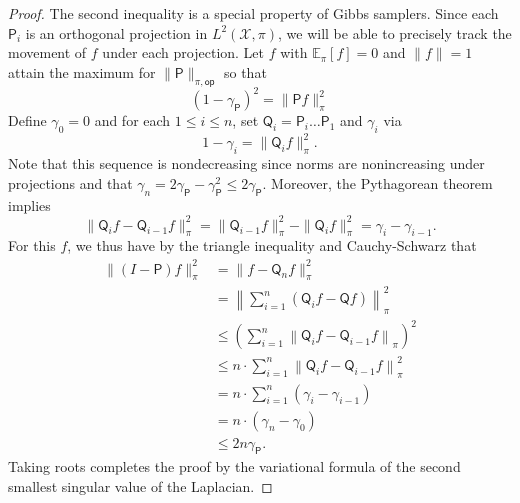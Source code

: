 \documentclass[10pt,a4paper]{article}
\begin{document}
\begin{proof}
    The second inequality is a special property of Gibbs samplers. Since each $\mathsf{P}_i$ is an orthogonal projection in $L^2(\mathcal{X},\pi)$, we will be able to precisely track the movement of $f$ under each projection. Let $f$ with $\mathbb{E}_{\pi}[f]=0$ and $\|f\|=1$ attain the maximum for $\|\mathsf{P}\|_{\pi,\mathsf{op}}$ so that
    \begin{equation*}
        (1-\gamma_{\mathsf{P}})^2=\|\mathsf{P}f\|_{\pi}^2
    \end{equation*} 
    Define $\gamma_0 = 0$ and for each $1\leq i\leq n$, set $\mathsf{Q}_i=\mathsf{P}_i\ldots \mathsf{P}_1$ and $\gamma_i$ via
    \begin{equation*}
        1-\gamma_i = \|\mathsf{Q}_if\|_{\pi}^2.
    \end{equation*}
    Note that this sequence is nondecreasing since norms are nonincreasing under projections and that $\gamma_n=2\gamma_{\mathsf{P}}-\gamma_{\mathsf{P}}^2\leq 2\gamma_{\mathsf{P}}$. Moreover, the Pythagorean theorem implies
    \begin{equation*}
        \|\mathsf{Q}_if-\mathsf{Q}_{i-1}f\|_{\pi}^2 = \|\mathsf{Q}_{i-1}f\|_{\pi}^2-\|\mathsf{Q}_if\|_{\pi}^2=\gamma_i-\gamma_{i-1}.
    \end{equation*}
    For this $f$, we thus have by the triangle inequality and Cauchy-Schwarz that
    \begin{align*}
        \|(I-\mathsf{P})f\|_{\pi}^2 &= \|f-\mathsf{Q}_nf\|_{\pi}^2\\
        &=\left\|\sum_{i=1}^n (\mathsf{Q}_if - \mathsf{Q}f)\right\|_{\pi}^2\\
        &\leq \left(\sum_{i=1}^n\left\|\mathsf{Q}_if - \mathsf{Q}_{i-1}f\right\|_{\pi}\right)^2\\
        &\leq n\cdot \sum_{i=1}^n\left\|\mathsf{Q}_if - \mathsf{Q}_{i-1}f\right\|_{\pi}^2\\
        &=n\cdot \sum_{i=1}^n(\gamma_i-\gamma_{i-1})\\
        &= n\cdot (\gamma_n-\gamma_0)\\
        &\leq 2n\gamma_{\mathsf{P}}.
    \end{align*}
Taking roots completes the proof by the variational formula of the second smallest singular value of the Laplacian.
\end{proof}
\end{document}
